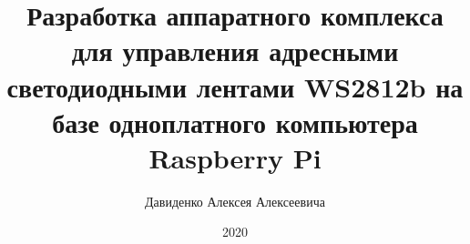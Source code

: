 
\title{Разработка аппаратного комплекса для управления адресными светодиодными лентами WS2812b на базе одноплатного компьютера Raspberry Pi}




\author{Давиденко Алексея Алексеевича}




\date{2020}

\maketitle

\secNumbering

\tableofcontents
